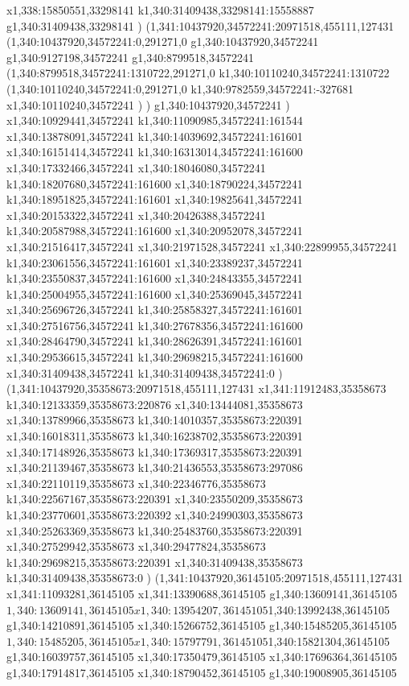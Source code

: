 {x1,338:15850551,33298141
k1,340:31409438,33298141:15558887
g1,340:31409438,33298141
)
(1,341:10437920,34572241:20971518,455111,127431
(1,340:10437920,34572241:0,291271,0
g1,340:10437920,34572241
g1,340:9127198,34572241
g1,340:8799518,34572241
(1,340:8799518,34572241:1310722,291271,0
k1,340:10110240,34572241:1310722
(1,340:10110240,34572241:0,291271,0
k1,340:9782559,34572241:-327681
x1,340:10110240,34572241
)
)
g1,340:10437920,34572241
)
x1,340:10929441,34572241
k1,340:11090985,34572241:161544
x1,340:13878091,34572241
k1,340:14039692,34572241:161601
x1,340:16151414,34572241
k1,340:16313014,34572241:161600
x1,340:17332466,34572241
x1,340:18046080,34572241
k1,340:18207680,34572241:161600
x1,340:18790224,34572241
k1,340:18951825,34572241:161601
x1,340:19825641,34572241
x1,340:20153322,34572241
x1,340:20426388,34572241
k1,340:20587988,34572241:161600
x1,340:20952078,34572241
x1,340:21516417,34572241
x1,340:21971528,34572241
x1,340:22899955,34572241
k1,340:23061556,34572241:161601
x1,340:23389237,34572241
k1,340:23550837,34572241:161600
x1,340:24843355,34572241
k1,340:25004955,34572241:161600
x1,340:25369045,34572241
x1,340:25696726,34572241
k1,340:25858327,34572241:161601
x1,340:27516756,34572241
k1,340:27678356,34572241:161600
x1,340:28464790,34572241
k1,340:28626391,34572241:161601
x1,340:29536615,34572241
k1,340:29698215,34572241:161600
x1,340:31409438,34572241
k1,340:31409438,34572241:0
)
(1,341:10437920,35358673:20971518,455111,127431
x1,341:11912483,35358673
k1,340:12133359,35358673:220876
x1,340:13444081,35358673
x1,340:13789966,35358673
k1,340:14010357,35358673:220391
x1,340:16018311,35358673
k1,340:16238702,35358673:220391
x1,340:17148926,35358673
k1,340:17369317,35358673:220391
x1,340:21139467,35358673
k1,340:21436553,35358673:297086
x1,340:22110119,35358673
x1,340:22346776,35358673
k1,340:22567167,35358673:220391
x1,340:23550209,35358673
k1,340:23770601,35358673:220392
x1,340:24990303,35358673
x1,340:25263369,35358673
k1,340:25483760,35358673:220391
x1,340:27529942,35358673
x1,340:29477824,35358673
k1,340:29698215,35358673:220391
x1,340:31409438,35358673
k1,340:31409438,35358673:0
)
(1,341:10437920,36145105:20971518,455111,127431
x1,341:11093281,36145105
x1,341:13390688,36145105
g1,340:13609141,36145105
$1,340:13609141,36145105
x1,340:13954207,36145105
$1,340:13992438,36145105
g1,340:14210891,36145105
x1,340:15266752,36145105
g1,340:15485205,36145105
$1,340:15485205,36145105
x1,340:15797791,36145105
$1,340:15821304,36145105
g1,340:16039757,36145105
x1,340:17350479,36145105
x1,340:17696364,36145105
g1,340:17914817,36145105
x1,340:18790452,36145105
g1,340:19008905,36145105
}
